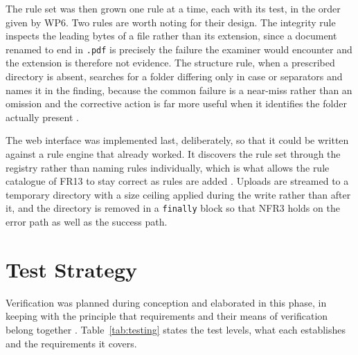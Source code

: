 \documentclass[a4paper,11pt]{article}
\begin{document}
The rule set was then grown one rule at a time, each with its test, in the order
given by WP6. Two rules are worth noting for their design. The integrity rule
inspects the leading bytes of a file rather than its extension, since a document
renamed to end in \texttt{.pdf} is precisely the failure the examiner would
encounter and the extension is therefore not evidence. The structure rule, when
a prescribed directory is absent, searches for a folder differing only in case
or separators and names it in the finding, because the common failure is a
near-miss rather than an omission and the corrective action is far more useful
when it identifies the folder actually present \citep{Combefis2022}.

The web interface was implemented last, deliberately, so that it could be written
against a rule engine that already worked. It discovers the rule set through the
registry rather than naming rules individually, which is what allows the rule
catalogue of FR13 to stay correct as rules are added \citep{Richards2020}.
Uploads are streamed to a temporary directory with a size ceiling applied during
the write rather than after it, and the directory is removed in a \texttt{finally}
block so that NFR3 holds on the error path as well as the success path.

\section{Test Strategy}\label{sec:testing}

Verification was planned during conception and elaborated in this phase, in
keeping with the principle that requirements and their means of verification
belong together \citep{Khorikov2020}. Table~\ref{tab:testing} states the test
levels, what each establishes and the requirements it covers.
\end{document}
